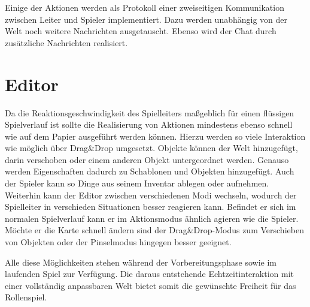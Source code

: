 Einige der Aktionen werden als Protokoll einer zweiseitigen Kommunikation zwischen Leiter und Spieler implementiert. Dazu werden unabhängig von der Welt noch weitere Nachrichten ausgetauscht. Ebenso wird der Chat durch zusätzliche Nachrichten realisiert.

\section{Editor}
\label{sec:Editor}
Da die Reaktionsgeschwindigkeit des Spielleiters maßgeblich für einen flüssigen Spielverlauf ist sollte die Realisierung von Aktionen mindestens ebenso schnell wie auf dem Papier ausgeführt werden können.\newline
Hierzu werden so viele Interaktion wie möglich über Drag\&Drop umgesetzt. Objekte können der Welt hinzugefügt, darin verschoben oder einem anderen Objekt untergeordnet werden. Genauso werden Eigenschaften dadurch zu Schablonen und Objekten hinzugefügt. Auch der Spieler kann so Dinge aus seinem Inventar ablegen oder aufnehmen.\newline
Weiterhin kann der Editor zwischen verschiedenen Modi wechseln, wodurch der Spielleiter in verschieden Situationen besser reagieren kann. Befindet er sich im normalen Spielverlauf kann er im Aktionsmodus ähnlich agieren wie die Spieler. Möchte er die Karte schnell ändern sind der Drag\&Drop-Modus zum Verschieben von Objekten oder der Pinselmodus hingegen besser geeignet.

Alle diese Möglichkeiten stehen während der Vorbereitungsphase sowie im laufenden Spiel zur Verfügung. Die daraus entstehende Echtzeitinteraktion mit einer vollständig anpassbaren Welt bietet somit die gewünschte Freiheit für das Rollenspiel.